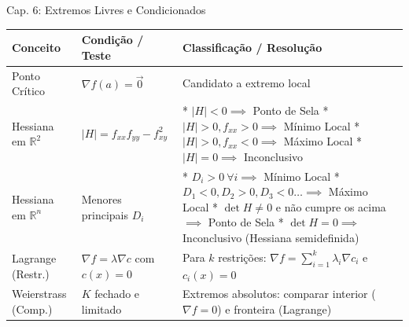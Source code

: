 \documentclass[11pt,a4paper]{article}
\newcommand{\R}{\mathbb{R}}
\begin{document}
\begin{definitionbox}[breakable, left=4pt, right=4pt, top=4pt, bottom=4pt, boxrule=0.6pt, colframe=accentColor]{Cap. 6: Extremos Livres e Condicionados}
  \def\arraystretch{1.2}
  \begin{tabular}{|p{2.2cm}|p{4.2cm}|p{10.2cm}|}
    \hline
    \textbf{Conceito} & \textbf{Condição / Teste} & \textbf{Classificação / Resolução} \\ \hline
    Ponto Crítico & $\nabla f(a) = \vec{0}$ & Candidato a extremo local \\ \hline
    Hessiana em $\R^2$ & $|H| = f_{xx}f_{yy} - f_{xy}^2$ & * $|H| < 0 \implies$ Ponto de Sela \newline
    * $|H| > 0, f_{xx} > 0 \implies$ Mínimo Local \newline
    * $|H| > 0, f_{xx} < 0 \implies$ Máximo Local \newline
    * $|H| = 0 \implies$ Inconclusivo \\ \hline
    Hessiana em $\R^n$ & Menores principais $D_i$ & * $D_i > 0 \ \forall i \implies$ Mínimo Local \newline
    * $D_1 < 0, D_2 > 0, D_3 < 0 \dots \implies$ Máximo Local \newline
    * $\det H \neq 0$ e não cumpre os acima $\implies$ Ponto de Sela \newline
    * $\det H = 0 \implies$ Inconclusivo (Hessiana semidefinida) \\ \hline
    Lagrange (Restr.) & $\nabla f = \lambda \nabla c$ com $c(x)=0$ & Para $k$ restrições: $\nabla f = \sum_{i=1}^k \lambda_i \nabla c_i$ e $c_i(x)=0$ \\ \hline
    Weierstrass (Comp.) & $K$ fechado e limitado & Extremos absolutos: comparar interior ($\nabla f = 0$) e fronteira (Lagrange) \\ \hline
  \end{tabular}
\end{definitionbox}
\end{document}
